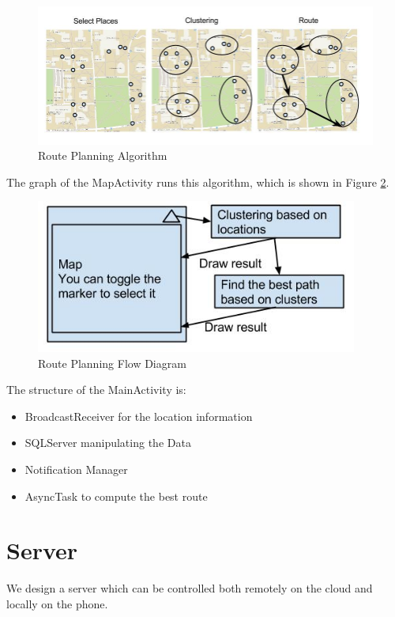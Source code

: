 \documentclass{article}
\begin{document}
\begin{figure}[h!]   
\centering
\includegraphics[width = \textwidth]{figures/Clustering.jpg}
\caption{Route Planning Algorithm}
\label{F:rpalgorithm}
\end{figure}

The graph of the MapActivity runs this algorithm, which is shown in Figure \ref{F:algo}.

\begin{figure}[h!]   
\centering
\includegraphics[width = 300pt]{figures/Algo.jpg}
\caption{Route Planning Flow Diagram}
\label{F:algo}
\end{figure}

The structure of the MainActivity is:
\begin{itemize}
\item
BroadcastReceiver for the location information

\item
SQLServer manipulating the Data

\item
Notification Manager

\item
AsyncTask to compute the best route

\end{itemize}


\section{Server}
We design a server which can be controlled both remotely on the cloud and locally on the phone. 
\end{document}
